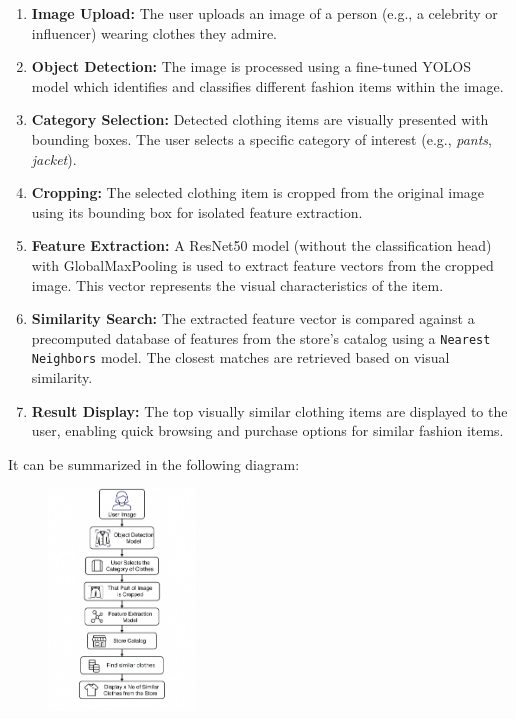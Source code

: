\begin{enumerate}
    \item \textbf{Image Upload:} The user uploads an image of a person (e.g., a celebrity or influencer) wearing clothes they admire.

    \item \textbf{Object Detection:} The image is processed using a fine-tuned YOLOS model which identifies and classifies different fashion items within the image.

    \item \textbf{Category Selection:} Detected clothing items are visually presented with bounding boxes. The user selects a specific category of interest (e.g., \textit{pants}, \textit{jacket}).

    \item \textbf{Cropping:} The selected clothing item is cropped from the original image using its bounding box for isolated feature extraction.

    \item \textbf{Feature Extraction:} A ResNet50 model (without the classification head) with GlobalMaxPooling is used to extract feature vectors from the cropped image. This vector represents the visual characteristics of the item.

    \item \textbf{Similarity Search:} The extracted feature vector is compared against a precomputed database of features from the store's catalog using a \texttt{Nearest Neighbors} model. The closest matches are retrieved based on visual similarity.

    \item \textbf{Result Display:} The top visually similar clothing items are displayed to the user, enabling quick browsing and purchase options for similar fashion items.
\end{enumerate}

It can be summarized in the following diagram:

\begin{figure}[H]
  \centering
    \includegraphics[width=0.35\textwidth]{images/workflow.png}
  \end{figure}

